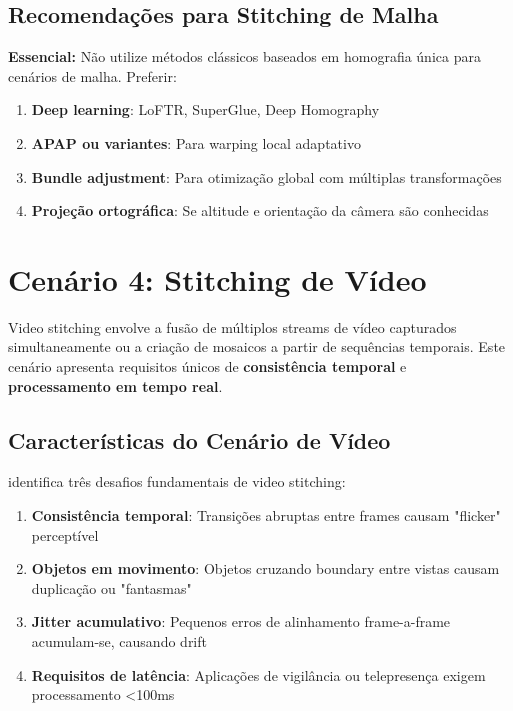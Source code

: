 \subsection{Recomendações para Stitching de Malha}

\textbf{Essencial:} Não utilize métodos clássicos baseados em homografia única para cenários de malha. Preferir:

\begin{enumerate}
    \item \textbf{Deep learning}: LoFTR, SuperGlue, Deep Homography
    \item \textbf{APAP ou variantes}: Para warping local adaptativo
    \item \textbf{Bundle adjustment}: Para otimização global com múltiplas transformações
    \item \textbf{Projeção ortográfica}: Se altitude e orientação da câmera são conhecidas
\end{enumerate}

\section{Cenário 4: Stitching de Vídeo}
\label{sec:video}

Video stitching envolve a fusão de múltiplos streams de vídeo capturados simultaneamente ou a criação de mosaicos a partir de sequências temporais. Este cenário apresenta requisitos únicos de \textbf{consistência temporal} e \textbf{processamento em tempo real}.

\subsection{Características do Cenário de Vídeo}

\cite{Jiang2015} identifica três desafios fundamentais de video stitching:

\begin{enumerate}
    \item \textbf{Consistência temporal}: Transições abruptas entre frames causam "flicker" perceptível

    \item \textbf{Objetos em movimento}: Objetos cruzando boundary entre vistas causam duplicação ou "fantasmas"

    \item \textbf{Jitter acumulativo}: Pequenos erros de alinhamento frame-a-frame acumulam-se, causando drift

    \item \textbf{Requisitos de latência}: Aplicações de vigilância ou telepresença exigem processamento <100ms
\end{enumerate}

